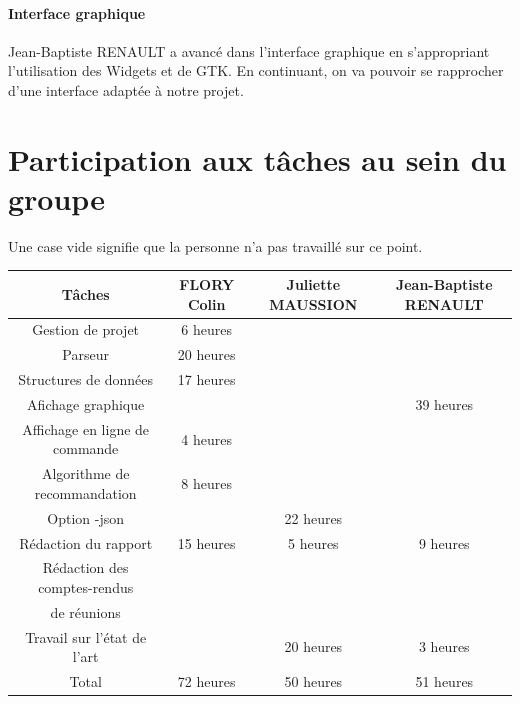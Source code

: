 \documentclass{article}
\begin{document}
\paragraph*{Interface graphique}\mbox{}
Jean-Baptiste RENAULT a avancé dans l'interface graphique en s'appropriant l'utilisation des Widgets et de GTK. En continuant, on va pouvoir se rapprocher d'une interface adaptée à notre projet.
\newpage

\section{Participation aux tâches au sein du groupe}
    \par Une case vide signifie que la personne n'a pas travaillé sur ce point.\\
    \begin{tabular}{|c|c|c|c|}
        \hline
        Tâches & FLORY Colin & Juliette MAUSSION & Jean-Baptiste RENAULT \\
        \hline
        \hline
        Gestion de projet & 6 heures  &  & \\
        \hline
        Parseur & 20 heures & & \\
        \hline
        Structures de données & 17 heures & & \\
        \hline
        Afichage graphique & & & 39 heures\\
        \hline
        Affichage en ligne de commande & 4 heures & & \\
        \hline
        Algorithme de recommandation & 8 heures & & \\
        \hline
        Option -json& & 22 heures & \\
        \hline
        Rédaction du rapport & 15 heures & 5 heures & 9 heures \\
        \hline
        Rédaction des comptes-rendus & \multirow{2}{*}{}&\multirow{2}{*}{} &\multirow{2}{*}{} \\ 
        de réunions & & 3 heures & \\
        \hline
        Travail sur l'état de l'art & & 20 heures & 3 heures\\
        \hline
        Total & 72 heures & 50 heures & 51 heures\\
        \hline
    \end{tabular}
\newpage


\end{document}
